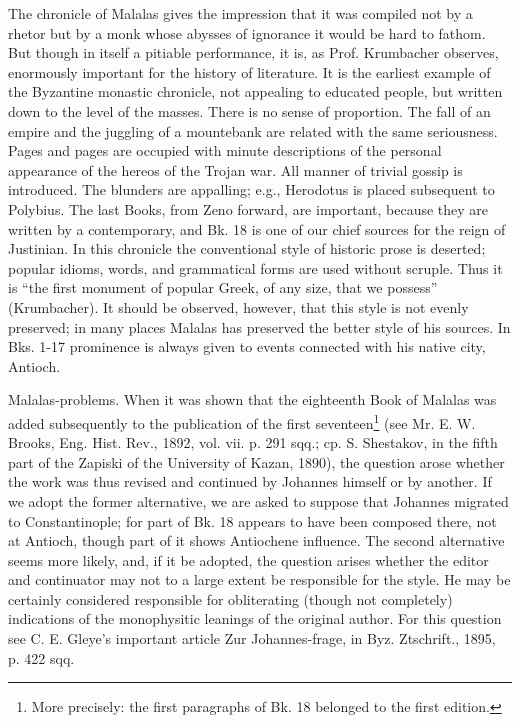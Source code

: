 The chronicle of Malalas gives the impression that it was compiled not by a rhetor but by a monk whose abysses of ignorance it would be hard to fathom. But though in itself a pitiable performance, it is, as Prof. Krumbacher observes, enormously important for the history of literature. It is the earliest example of the Byzantine monastic chronicle, not appealing to educated people, but written down to the level of the masses. There is no sense of proportion. The fall of an empire and the juggling of a mountebank are related with the same seriousness. Pages and pages are occupied with minute descriptions of the personal appearance of the hereos of the Trojan war. All manner of trivial gossip is introduced. The blunders are appalling; e.g., Herodotus is placed subsequent to Polybius. The last Books, from Zeno forward, are important, because they are written by a contemporary, and Bk. 18 is one of our chief sources for the reign of Justinian. In this chronicle the conventional style of historic prose is deserted; popular idioms, words, and grammatical forms are used without scruple. Thus it is \texthebrew{“}the first monument of popular Greek, of any size, that we possess\texthebrew{}” (Krumbacher). It should be observed, however, that this style is not evenly preserved; in many places Malalas has preserved the better style of his sources. In Bks. 1-17 prominence is always given to events connected with his native city, Antioch.

Malalas-problems. When it was shown that the eighteenth Book of Malalas was added subsequently to the publication of the first seventeen\footnote{More precisely: the first paragraphs of Bk. 18 belonged to the first edition.} (see Mr. E. W. Brooks, Eng. Hist. Rev., 1892, vol. vii. p. 291 sqq.; cp. S. Shestakov, in the fifth part of the Zapiski of the University of Kazan, 1890), the question arose whether the work was thus revised and continued by Johannes himself or by another. If we adopt the former alternative, we are asked to suppose that Johannes migrated to Constantinople; for part of Bk. 18 appears to have been composed there, not at Antioch, though part of it shows Antiochene influence. The second alternative seems more likely, and, if it be adopted, the question arises whether the editor and continuator may not to a large extent be responsible for the style. He may be certainly considered responsible for obliterating (though not completely) indications of the monophysitic leanings of the original author. For this question see C. E. Gleye\texthebrew{}’s important article Zur Johannes-frage, in Byz. Ztschrift., 1895, p. 422 sqq.

